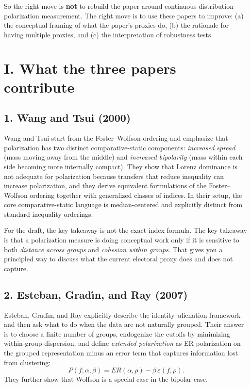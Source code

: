 \documentclass[12pt]{article}
\begin{document}
So the right move is \textbf{not} to rebuild the paper around continuous-distribution polarization measurement. The right move is to use these papers to improve: (a) the conceptual framing of what the paper's proxies do, (b) the rationale for having multiple proxies, and (c) the interpretation of robustness tests.

\section*{I. What the three papers contribute}

\subsection*{1. Wang and Tsui (2000)}
Wang and Tsui start from the Foster--Wolfson ordering and emphasize that polarization has two distinct comparative-static components: \emph{increased spread} (mass moving away from the middle) and \emph{increased bipolarity} (mass within each side becoming more internally compact). They show that Lorenz dominance is not adequate for polarization because transfers that reduce inequality can increase polarization, and they derive equivalent formulations of the Foster--Wolfson ordering together with generalized classes of indices. In their setup, the core comparative-static language is median-centered and explicitly distinct from standard inequality orderings.

For the draft, the key takeaway is not the exact index formula. The key takeaway is that a polarization measure is doing conceptual work only if it is sensitive to both \emph{distance across groups} and \emph{cohesion within groups}. That gives you a principled way to discuss what the current electoral proxy does and does not capture.

\subsection*{2. Esteban, Grad\'{\i}n, and Ray (2007)}
Esteban, Grad\'{\i}n, and Ray explicitly describe the identity--alienation framework and then ask what to do when the data are not naturally grouped. Their answer is to choose a finite number of groups, endogenize the cutoffs by minimizing within-group dispersion, and define \emph{extended polarization} as ER polarization on the grouped representation minus an error term that captures information lost from clustering:
\begin{equation*}
P(f;\alpha,\beta)=ER(\alpha,\rho)-\beta\,\varepsilon(f,\rho).
\end{equation*}
They further show that Wolfson is a special case in the bipolar case.
\end{document}
